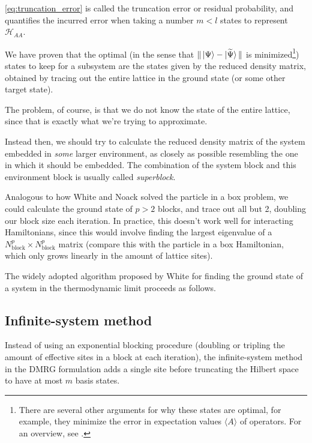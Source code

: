 \eqref{eq:truncation_error} is called the truncation error or residual
probability, and quantifies the incurred error when taking a number $m < l$ states to
represent $\mathcal{H}_{AA}$.

We have proven that the optimal (in the sense that $\Vert \ket{\Psi}
- \ket{\widetilde{\Psi}} \Vert$ is minimized\footnote{There are several other
arguments for why these states are optimal, for example, they minimize the
error in expectation values $\langle A \rangle$ of operators. For an overview,
see \cite{schollwock2005density}.}) states to keep for a subsystem are the
states given by the reduced density matrix, obtained by tracing out the entire
lattice in the ground state (or some other target state).

The problem, of
course, is that we do not know the state of the entire lattice, since that is
exactly what we're trying to approximate.

Instead then, we should try to calculate the reduced density matrix of the
system embedded in \textit{some} larger environment, as closely as possible
resembling the one in which it should be embedded.  The combination of the
system block and this environment block is usually called \textit{superblock}.

Analogous to how White and Noack solved the particle in a box problem, we could
calculate the ground state of $p > 2$ blocks,
and trace out all but 2, doubling our block size each iteration. In
practice, this doesn't work well for interacting Hamiltonians, since this
would involve finding the largest eigenvalue of a $N_{\text{block}}^p
\times N_{\text{block}}^p$ matrix (compare this with the particle in a box
Hamiltonian, which only grows linearly in the amount of lattice sites).

The widely adopted algorithm proposed by White \cite{white1993density} for
finding the ground state of a system in the thermodynamic limit proceeds
as follows.

\subsection{Infinite-system method}

 
Instead of using an exponential blocking procedure (doubling or tripling the
amount of effective sites in a block at each iteration), the infinite-system
method in the DMRG formulation adds a single site before truncating the Hilbert
space to have at most $m$ basis states.

